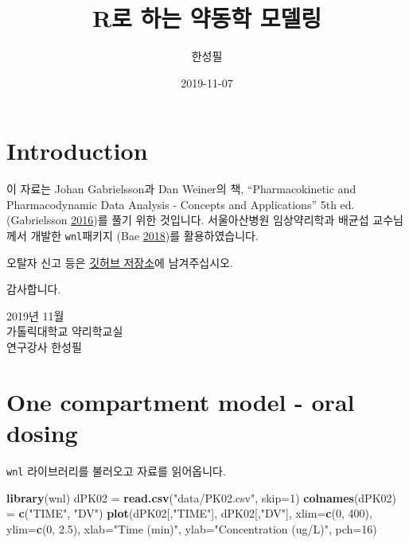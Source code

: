 \documentclass[9pt,]{krantz}
\title{R로 하는 약동학 모델링}
\author{한성필}
\date{2019-11-07}
\newenvironment{Shaded}{\begin{snugshade}}{\end{snugshade}}
\newcommand{\KeywordTok}[1]{\textcolor[rgb]{0.13,0.29,0.53}{\textbf{#1}}}
\newcommand{\DataTypeTok}[1]{\textcolor[rgb]{0.13,0.29,0.53}{#1}}
\newcommand{\DecValTok}[1]{\textcolor[rgb]{0.00,0.00,0.81}{#1}}
\newcommand{\FloatTok}[1]{\textcolor[rgb]{0.00,0.00,0.81}{#1}}
\newcommand{\StringTok}[1]{\textcolor[rgb]{0.31,0.60,0.02}{#1}}
\newcommand{\NormalTok}[1]{#1}
\begin{document}
\maketitle

{
\hypersetup{linkcolor=black}
\setcounter{tocdepth}{2}
\tableofcontents
}
\listoftables
\listoffigures
\chapter*{Introduction}\label{introduction}


이 자료는 Johan Gabrielsson과 Dan Weiner의 책, ``Pharmacokinetic and
Pharmacodynamic Data Analysis - Concepts and Applications'' 5th ed.
(Gabrielsson \protect\hyperlink{ref-gab}{2016})를 풀기 위한 것입니다.
서울아산병원 임상약리학과 배균섭 교수님께서 개발한 \texttt{wnl}패키지
(Bae \protect\hyperlink{ref-R-wnl}{2018})를 활용하였습니다.

오탈자 신고 등은
\href{https://github.com/pipetcpt/study-pkpd/issues}{깃허브 저장소}에
남겨주십시오.

감사합니다.

2019년 11월\\
가톨릭대학교 약리학교실\\
연구강사 한성필

\mainmatter

\chapter{One compartment model - oral
dosing}\label{one-compartment-model---oral-dosing}

\texttt{wnl} 라이브러리를 불러오고 자료를 읽어옵니다.

\begin{Shaded}
\begin{Highlighting}[]
\KeywordTok{library}\NormalTok{(wnl)}
\NormalTok{dPK02 =}\StringTok{ }\KeywordTok{read.csv}\NormalTok{(}\StringTok{"data/PK02.csv"}\NormalTok{, }\DataTypeTok{skip=}\DecValTok{1}\NormalTok{)}
\KeywordTok{colnames}\NormalTok{(dPK02) =}\StringTok{ }\KeywordTok{c}\NormalTok{(}\StringTok{"TIME"}\NormalTok{, }\StringTok{"DV"}\NormalTok{)}
\KeywordTok{plot}\NormalTok{(dPK02[,}\StringTok{"TIME"}\NormalTok{], dPK02[,}\StringTok{"DV"}\NormalTok{], }\DataTypeTok{xlim=}\KeywordTok{c}\NormalTok{(}\DecValTok{0}\NormalTok{, }\DecValTok{400}\NormalTok{), }\DataTypeTok{ylim=}\KeywordTok{c}\NormalTok{(}\DecValTok{0}\NormalTok{, }\FloatTok{2.5}\NormalTok{), }
     \DataTypeTok{xlab=}\StringTok{"Time (min)"}\NormalTok{, }\DataTypeTok{ylab=}\StringTok{"Concentration (ug/L)"}\NormalTok{, }\DataTypeTok{pch=}\DecValTok{16}\NormalTok{)}
\end{Highlighting}
\end{Shaded}
\end{document}
